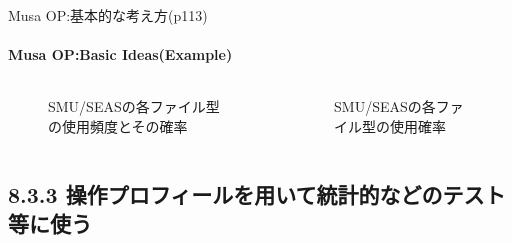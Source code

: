 
\begin{frame}[shrink=10]{Musa OP:基本的な考え方(p113)}
\label{frame:basicideas}
\framesubtitle{Musa OP:Basic Ideas(Example)}
\begin{columns}

\begin{column}{0.4\textwidth}
\begin{figure}
\begin{center}
\caption{SMU/SEASの各ファイル型の使用頻度とその確率}
\end{center}
\end{figure}
\end{column}
\begin{column}{0.6\textwidth}
\begin{figure}
\begin{center}
\caption{SMU/SEASの各ファイル型の使用確率}
\end{center}
\end{figure}
\end{column}
\end{columns}

\end{frame}

\subsection{8.3.3 操作プロフィールを用いて統計的などのテスト等に使う}

